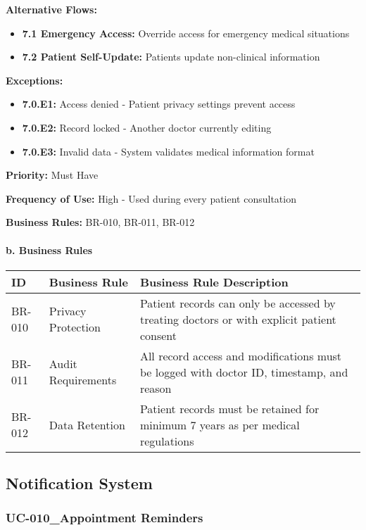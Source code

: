 \documentclass[12pt,a4paper]{article}
\begin{document}
\textbf{Alternative Flows:}
\begin{itemize}
    \item \textbf{7.1 Emergency Access:} Override access for emergency medical situations
    \item \textbf{7.2 Patient Self-Update:} Patients update non-clinical information
\end{itemize}

\textbf{Exceptions:}
\begin{itemize}
    \item \textbf{7.0.E1:} Access denied - Patient privacy settings prevent access
    \item \textbf{7.0.E2:} Record locked - Another doctor currently editing
    \item \textbf{7.0.E3:} Invalid data - System validates medical information format
\end{itemize}

\textbf{Priority:} Must Have

\textbf{Frequency of Use:} High - Used during every patient consultation

\textbf{Business Rules:} BR-010, BR-011, BR-012

\paragraph{b. Business Rules}

\begin{longtable}{|p{2cm}|p{4cm}|p{8cm}|}
\hline
\textbf{ID} & \textbf{Business Rule} & \textbf{Business Rule Description} \\
\hline
BR-010 & Privacy Protection & Patient records can only be accessed by treating doctors or with explicit patient consent \\
\hline
BR-011 & Audit Requirements & All record access and modifications must be logged with doctor ID, timestamp, and reason \\
\hline
BR-012 & Data Retention & Patient records must be retained for minimum 7 years as per medical regulations \\
\hline
\end{longtable}

\subsection{Notification System}

\subsubsection{UC-010\_Appointment Reminders}
\end{document}
